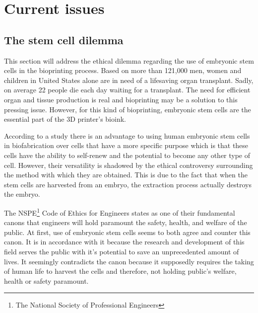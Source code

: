 \documentclass[12pt]{article} %
\begin{document}
\newpage


\section{Current issues} %

\subsection{The stem cell dilemma} %

This section will address the ethical dilemma regarding the use of embryonic stem cells in the bioprinting process. 
Based on \cite{OPTN data as of January 2016} more than 121,000 men, women and children in United States alone are in need of a lifesaving organ transplant. Sadly, on average 22 people die each day waiting for a transplant. The need for efficient organ and tissue production is real and bioprinting may be a solution to this pressing issue. However, for this kind of bioprinting, embryonic stem cells are the essential part of the 3D printer's bioink.

According to a study \cite{Faulkner-Jones:2013} there is an advantage to using human embryonic stem cells in biofabrication over cells that have a more specific purpose which is that these cells have the ability to self-renew and the potential to become any other type of cell. However, their versatility is shadowed by the ethical controversy surrounding the method with which they are obtained. This is due to the fact that when the stem cells are harvested from an embryo, the extraction process actually destroys the embryo. 

The NSPE\footnote{The National Society of Professional Engineers} Code of Ethics for Engineers states as one of their fundamental canons that engineers will hold paramount the safety, health, and welfare of the public. At first, use of embryonic stem cells seems to both agree and counter this canon. 
It is in accordance with it because the research and development of this field serves the public with it's potential to save an unprecedented amount of lives. 
It seemingly contradicts the canon because it supposedly requires the taking of human life to harvest the cells and therefore, not holding public's welfare, health or safety paramount. 
\end{document}
